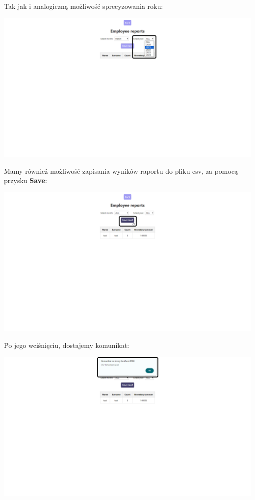 \documentclass[12pt]{article}
\begin{document}
\begin{minipage}{\textwidth}
\noindent Tak jak i analogiczną możliwość sprecyzowania roku:
\begin{center}
\includegraphics[width=\textwidth]{media/Reports_year.png}
\end{center}
\end{minipage}

\begin{minipage}{\textwidth}
\noindent Mamy również możliwość zapisania wyników raportu do pliku csv, za pomocą przysku \textbf{Save}:
\begin{center}
\includegraphics[width=\textwidth]{media/Reports_save.png}
\end{center}
\end{minipage}

\begin{minipage}{\textwidth}
\noindent Po jego wciśnięciu, dostajemy komunikat:
\begin{center}
\includegraphics[width=\textwidth]{media/Reports_saved.png}
\end{center}
\end{minipage}
\end{document}
